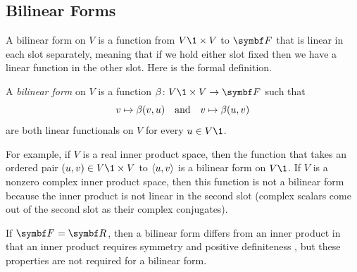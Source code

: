 \subsection{Bilinear Forms}

A bilinear form on $V$ is a function from $V\1 \times V$ to $\F{}$ that is linear in each slot separately, meaning that if we hold either slot fixed then we have a linear function in the other slot. Here is the formal definition.

{A \emph{bilinear form} on $V$ is a function $\fun \beta {V\1 \times V} \F{}$ such that
\[
v \mapsto \beta(v, u) \quad \text{and} \quad v \mapsto \beta(u,v)
\]
are both linear functionals on $V$ for every $u \in V\1$.}


For example, if $V$ is a real inner product space, then the function that takes an ordered pair $(u, v) \in V\1 \times V$ to $\langle u, v\rangle$ is a bilinear form on $V\1$. If $V$ is a nonzero complex inner product space, then this function is not a bilinear form because the inner product is not linear in the second slot (complex scalars come out of the second slot as their complex conjugates).

If $\F{} = \R{}$, then a bilinear form differs from an inner product in that an inner product requires symmetry  and positive definiteness , but these properties are not required for a bilinear form.

